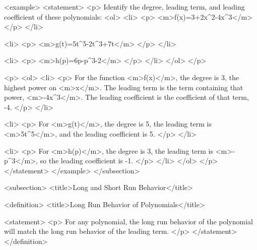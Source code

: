         <example>
            <statement>
                <p>
                    Identify the degree, leading term, and leading coefficient of these polynomials:
                    <ol>
                        <li>
                            <p>
                                <m>f(x)=3+2x^{2}-4x^{3}</m>
                            </p>
                        </li>

                        <li>
                            <p>
                                <m>g(t)=5t^{5}-2t^{3}+7t</m>
                            </p>
                        </li>

                        <li>
                            <p>
                                <m>h(p)=6p-p^{3}-2</m>
                            </p>
                        </li>
                    </ol>
                </p>

                <p>
                    <ol>
                        <li>
                            <p>
                                For the function <m>f(x)</m>, the degree is 3, the highest power on <m>x</m>.
                                The leading term is the term containing that power, <m>-4x^{3}</m>.
                                The leading coefficient is the coefficient of that term, -4.
                            </p>
                        </li>

                        <li>
                            <p>
                                For <m>g(t)</m>, the degree is 5, the leading term is <m>5t^{5}</m>, and the leading coefficient is 5.
                            </p>
                        </li>

                        <li>
                            <p>
                                For <m>h(p)</m>, the degree is 3, the leading term is <m>-p^{3}</m>, so the leading coefficient is -1.
                            </p>
                        </li>
                    </ol>
                </p>
            </statement>
        </example>
    </subsection>


    <subsection>
        <title>Long and Short Run Behavior</title>

        <definition>
            <title>Long Run Behavior of Polynomials</title>

            <statement>
                <p>
                    For any polynomial, the long run behavior of the polynomial will match the long run behavior of the leading term.
                </p>
            </statement>
        </definition>


